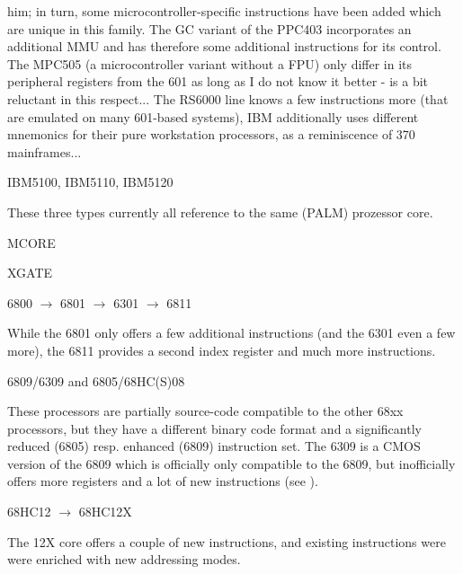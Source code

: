 \documentclass[12pt,twoside]{report}
\begin{document}
him; in turn, some microcontroller-specific instructions have been added
which are unique in this family.  The GC variant of the PPC403
incorporates an additional MMU and has therefore some additional
instructions for its control.  The MPC505 (a microcontroller variant
without a FPU) only differ in its peripheral registers from the 601 as
long as I do not know it better - \cite{Mot505} is a bit reluctant in this
respect...  The RS6000 line knows a few instructions more (that are
emulated on many 601-based systems), IBM additionally uses different
mnemonics for their pure workstation processors, as a reminiscence of 370
mainframes...
\begin{cpulist}
   IBM5100, IBM5110, IBM5120
\end{cpulist}
These three types currently all reference to the same (PALM)
prozessor core.
\begin{cpulist}
   MCORE
\end{cpulist}
\begin{cpulist}
   XGATE
\end{cpulist}
\begin{cpulist}
   6800 $\rightarrow$ 6801 $\rightarrow$ 6301 $\rightarrow$ 6811
\end{cpulist}
While the 6801 only offers a few additional instructions (and the
6301 even a few more), the 6811 provides a second index register and
much more instructions.
\begin{cpulist}
   6809/6309 and 6805/68HC(S)08
\end{cpulist}
These processors are partially source-code compatible to the other
68xx processors, but they have a different binary code format and a
significantly reduced (6805) resp. enhanced (6809) instruction set.
The 6309 is a CMOS version of the 6809 which is officially only
compatible to the 6809, but inofficially offers more registers and a
lot of new instructions (see \cite{Kaku}).
\begin{cpulist}
   68HC12 $\longrightarrow$ 68HC12X
\end{cpulist}
The 12X core offers a couple of new instructions, and existing
instructions were were enriched with new addressing modes.
\end{document}
